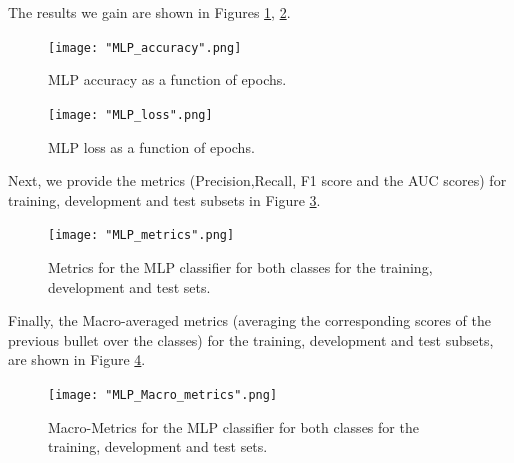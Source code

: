 \documentclass[10pt, a4paper]{article}
\begin{document}
    The results we gain are shown in Figures \ref{fig::mlp_accuracy}, \ref{fig::mlp_loss}.

    \begin{figure}
	    \centering
            \texttt{[image: "MLP\_accuracy".png]}
	    \caption{MLP accuracy as a function of epochs.}
	    \label{fig::mlp_accuracy}
    \end{figure}

    \begin{figure}
	    \centering
            \texttt{[image: "MLP\_loss".png]}
	    \caption{MLP loss as a function of epochs.}
	    \label{fig::mlp_loss}
	\end{figure}

    Next, we provide the metrics (Precision,Recall, F1 score and the AUC scores) for training, development and test subsets in Figure \ref{fig::mlp_metrics}.

    \begin{figure}
	    \centering
            \texttt{[image: "MLP\_metrics".png]}
	    \caption{Metrics for the MLP classifier for both classes for the training, development and test sets.}
	    \label{fig::mlp_metrics}
    \end{figure}

    Finally,  the Macro-averaged metrics (averaging the corresponding scores of the previous bullet over the classes) for the training, development and test subsets, are shown in Figure \ref{fig::mlp_macro_metrics}.

    \begin{figure}
	    \centering
            \texttt{[image: "MLP\_Macro\_metrics".png]}
	    \caption{Macro-Metrics for the MLP classifier for both classes for the training, development and test sets.}
	    \label{fig::mlp_macro_metrics}
    \end{figure}

    

	\printbibliography
	
\end{document}
